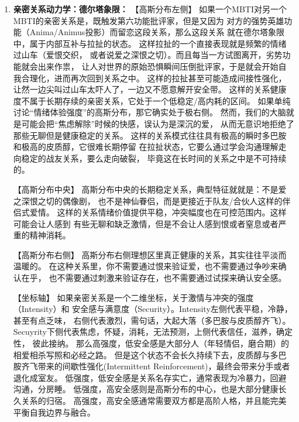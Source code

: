 \documentclass[UTF8,letter,10pt]{ctexart}
\begin{document}
\begin{table}[h!]
\begin{enumerate}
        很难再发生投射，于是就不再会产生那种 ``失去理智，非TA不可'' 的强迫性质迷恋。
        相反，这个阶段的爱情变成了 ``不是因为你必须有TA才能活，而是你选择了TA''。
    \item \textbf{亲密关系动力学：德尔塔象限：}
        【高斯分布左侧】
        如果一个MBTI对另一个MBTI的亲密关系是，既触发第六功能批评家，但是又因为
        对方的强势英雄功能（Anima/Animus投影）而留恋这段关系，那么这段关系
        就在德尔塔象限中，属于内部互补与拉扯的状态。
        这样拉扯的一个直接表现就是频繁的情绪过山车（爱恨交织，
        或者说爱之深恨之切）。而且每当一方试图离开，劣势功能就会出来作祟，
        让人对世界的原始恐惧瞬间压倒批评家，于是就会开始自我合理化，进而再次回到关系之中。
        这样的拉扯甚至可能造成间接性强化，让然一边尖叫过山车太吓人了，一边又不愿意解开安全带。
        这样的关系健康度不属于长期存续的亲密关系，它处于一个低稳定/高内耗的区间。
        如果单纯讨论``情绪体验强度''的高斯分布，那它确实处于极右侧。
        然而，我们的大脑就是可能会把``焦虑解除''时候的快感，误认为是深沉的爱，
        从而无意识地拒绝了那些无聊但是健康稳定的关系。
        这样的关系模式往往具有极高的瞬时多巴胺和极高的皮质醇，它很难长期停留
        在拉扯状态，它要么通过学会沟通理解走向稳定的战友关系，要么走向破裂，
        毕竟这在长时间的关系之中是不可持续的。

        【高斯分布中央】
        高斯分布中央的长期稳定关系，典型特征就就是：不是爱之深恨之切的偶像剧，
        也不是神仙眷侣，而是更接近于队友/合伙人这样的伴侣式爱情。
        这样的关系情绪价值提供平稳，冲突幅度也在可控范围内。这样可能会让人感到
        有些无聊和缺乏激情，但是不会让人感到恨或者窒息或者严重的精神消耗。
        
        【高斯分布右侧】
        高斯分布右侧理想区里真正健康的关系，其实往往平淡而温暖的。
        在这种关系里，你不需要通过恨来验证爱，也不需要通过争吵来确认在乎，
        也不需要通过刺激来验证存在，也不需要通过试探来确认安全感。

        【坐标轴】
        如果亲密关系是一个二维坐标，关于激情与冲突的强度（Intensity）和
        安全感与满意度（Security）。Intensity左侧代表平稳，冷静，甚至有点乏味，
        右侧代表激烈，需句话，大起大落（多巴胺与皮质醇齐飞）。
        Secuyrity下侧代表焦虑，怀疑，消耗，无法预测，上侧代表信任，滋养，确定性，
        彼此接纳。
        那么高强度，低安全感是大部分人（年轻情侣，磨合期）的相爱相杀写照和必经之路。
        但是这个状态不会长久持续下去，皮质醇与多巴胺齐飞带来的间歇性强化(Intermittent Reinforcement)，最终会带来分手或者退化成室友。
        低强度，低安全感是关系名存实亡，通常表现为冷暴力，回避沟通，分房睡。
        低强度，高安全感则是高斯分布的中心，也是大部分健康长久关系的归宿。
        高强度，高安全感通常需要双方都是高阶人格，并且能完美平衡自我边界与融合。
\end{enumerate}
\end{table}
\end{document}
